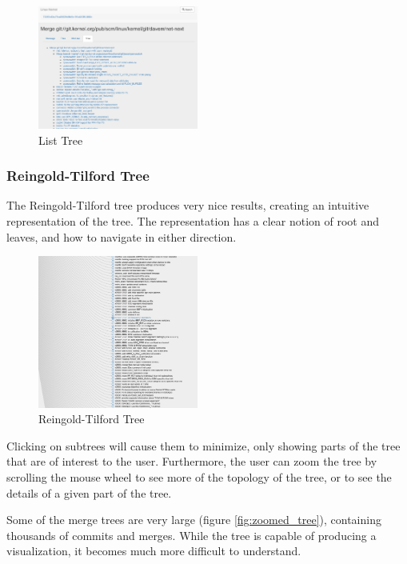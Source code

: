 \documentclass[conference, draftclsnofoot]{IEEEtran}
\begin{document}
\begin{figure}
        \centering
        \includegraphics[width=0.47\textwidth]{figures/list_tree.png}
        \caption{List Tree}
        \label{fig:list_tree}
\end{figure}


\subsubsection{Reingold-Tilford Tree}


The Reingold-Tilford tree produces very nice results, creating an intuitive
representation of the tree. The representation has a clear notion of root and
leaves, and how to navigate in either direction.

\begin{figure}
        \centering
        \includegraphics[width=0.47\textwidth]{figures/tree_view.png}
        \caption{Reingold-Tilford Tree}
        \label{fig:tree}
\end{figure}

Clicking on subtrees will cause them to minimize, only showing parts of the tree
that are of interest to the user. Furthermore, the user can zoom the tree by
scrolling the mouse wheel to see more of the topology of the tree, or to see the
details of a given part of the tree.

Some of the merge trees are very large (figure \ref{fig:zoomed_tree}), containing
thousands of commits and merges. While the tree is capable of producing a
visualization, it becomes much more difficult to understand.
\end{document}

